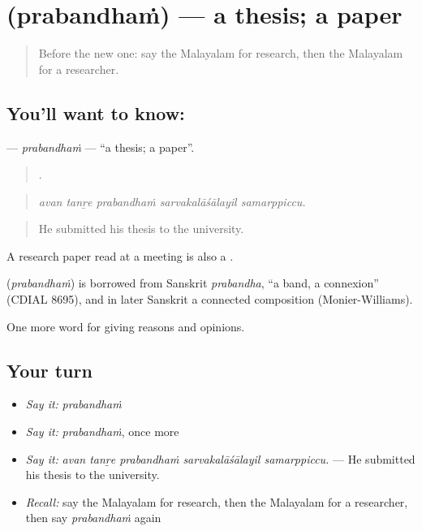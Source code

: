 \section[\texorpdfstring{\ml{പ്രബന്ധം} (prabandhaṁ)}{പ്രബന്ധം (prabandhaṁ)}]{ (prabandhaṁ) — a thesis; a paper}

\label{lesson:ML-C432-prabandham}



\begin{quote}
Before the new one: say the Malayalam for research, then the Malayalam for a researcher.
\end{quote}

\subsection*{You'll want to know: }
\textbf{} — \emph{prabandhaṁ} — \textquotedblleft{}a thesis; a paper\textquotedblright{}.

\begin{quote}
    .
\end{quote}

\begin{quote}
\emph{avan tanṟe prabandhaṁ sarvakalāśālayil samarppiccu.}
\end{quote}

\begin{quote}
He submitted his thesis to the university.
\end{quote}

A research paper read at a meeting is also a .

\begin{cousinweb}
\textbf{} (\emph{prabandhaṁ}) is borrowed from Sanskrit \emph{prabandha}, \textquotedblleft{}a band, a connexion\textquotedblright{} (CDIAL 8695), and in later Sanskrit a connected composition (Monier-Williams).
\end{cousinweb}

\begin{grammarlens}[title={What you've built}]
One more word for giving reasons and opinions.
\end{grammarlens}

\subsection*{Your turn}
\begin{itemize}
\raggedright
  \item \emph{Say it:} \emph{prabandhaṁ}
  \item \emph{Say it:} \emph{prabandhaṁ}, once more
  \item \emph{Say it:} \emph{avan tanṟe prabandhaṁ sarvakalāśālayil samarppiccu.} — He submitted his thesis to the university.
  \item \emph{Recall:} say the Malayalam for research, then the Malayalam for a researcher, then say \emph{prabandhaṁ} again
\end{itemize}

